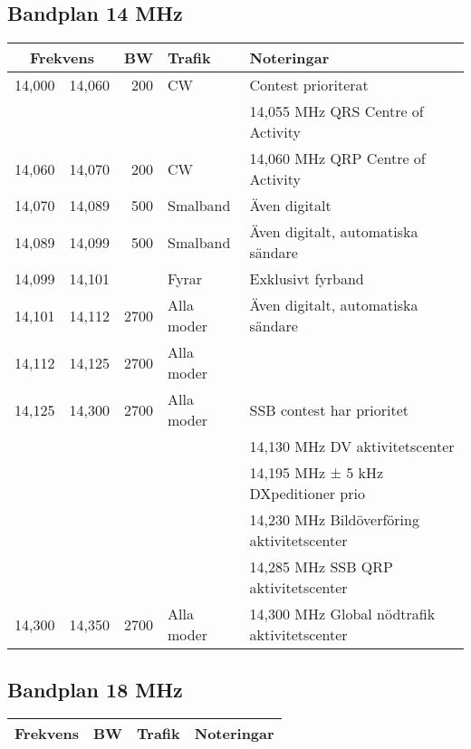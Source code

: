 \begin{landscape}
\subsection{Bandplan 14 MHz}
\begin{tabular}{rrrll}
\multicolumn{2}{c}{\textbf{Frekvens}} &  \textbf{BW} & \textbf{Trafik} & \textbf{Noteringar} \\ \hline

14,000 & 14,060 & 200  & CW         & Contest prioriterat                          \\
       &        &      &            & 14,055 MHz QRS Centre of Activity            \\ \hline
14,060 & 14,070 & 200  & CW         & 14,060 MHz QRP Centre of Activity            \\ \hline
14,070 & 14,089 & 500  & Smalband   & Även digitalt                                \\ \hline
14,089 & 14,099 & 500  & Smalband   & Även digitalt, automatiska sändare           \\ \hline
14,099 & 14,101 &      & Fyrar      & Exklusivt fyrband                            \\ \hline
14,101 & 14,112 & 2700 & Alla moder & Även digitalt, automatiska sändare           \\ \hline
14,112 & 14,125 & 2700 & Alla moder &                                              \\ \hline
14,125 & 14,300 & 2700 & Alla moder & SSB contest har prioritet                    \\ 
       &        &      &            & 14,130 MHz DV aktivitetscenter               \\
       &        &      &            & 14,195 MHz ± 5 kHz DXpeditioner prio         \\
       &        &      &            & 14,230 MHz Bildöverföring aktivitetscenter   \\
       &        &      &            & 14,285 MHz SSB QRP aktivitetscenter          \\ \hline
14,300 & 14,350 & 2700 & Alla moder & 14,300 MHz Global nödtrafik aktivitetscenter \\ \hline
\end{tabular}
\clearpage

\subsection{Bandplan 18 MHz}
\begin{tabular}{rrrll}
\multicolumn{2}{c}{\textbf{Frekvens}} &  \textbf{BW} & \textbf{Trafik} & \textbf{Noteringar} \\ \hline


\end{tabular}
\end{landscape}
